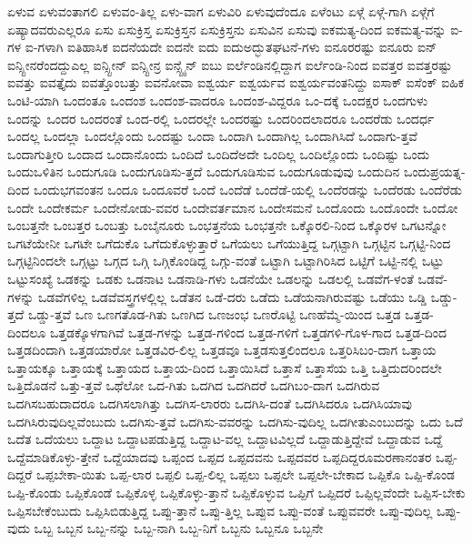 {ಏಳುವ
ಏಳುವಂತಾಗಲಿ
ಏಳುವಂ-ತಿಲ್ಲ
ಏಳು-ವಾಗ
ಏಳುವಿರಿ
ಏಳುವುದೆಂದೂ
ಏಳೆಂಟು
ಏಳ್ಗೆ
ಏಳ್ಗೆ-ಗಾಗಿ
ಏಳ್ಗೆಗೆ
ಏಷ್ಯಾದವರುಎಲ್ಲರೂ
ಏಸು
ಏಸುಕ್ರಿಸ್ತ
ಏಸುಕ್ರಿಸ್ತನ
ಏಸುಕ್ರಿಸ್ತನು
ಏಸುವಿನ
ಏಸುವು
ಐಕಮತ್ಯ-ದಿಂದ
ಐಕಮತ್ಯ-ವನ್ನು
ಐ-ಗಳ
ಐ-ಗಳಾಗಿ
ಐತಿಹಾಸಿಕ
ಐದನೆಯದೇ
ಐದನೇ
ಐದು
ಐದುಅದ್ಭುತಘಟನೆ-ಗಳು
ಐನೂರರಷ್ಟು
ಐನೂರು
ಐನ್
ಐನ್ಸ್ಟೀನರೆಂದದ್ದುಎಲ್ಲ
ಐನ್ಸ್ಟೀನ್
ಐನ್ಸ್ಟೀನ್ರ
ಐನ್ಸ್ಟೈನ್
ಐಬು
ಐರ್ಲೆಂಡಿನಲ್ಲಿದ್ದಾಗ
ಐರ್ಲೆಂಡಿ-ನಿಂದ
ಐವತ್ತರ
ಐವತ್ತರಷ್ಟು
ಐವತ್ತು
ಐವತ್ತೈದು
ಐವತ್ತೊಂಬತ್ತು
ಐವನೋವಾ
ಐಶ್ವರ್ಯ
ಐಶ್ವರ್ಯವ
ಐಶ್ವರ್ಯವಂತನಿದ್ದು
ಐಸಾಕ್
ಐಸೆಂಕ್
ಐಹಿಕ
ಒಂಟಿ-ಯಾಗಿ
ಒಂದಂತೂ
ಒಂದಂಶ
ಒಂದಂಶ-ವಾದರೂ
ಒಂದಂಶ-ವಿದ್ದರೂ
ಒಂ-ದಕ್ಕೆ
ಒಂದಕ್ಷರ
ಒಂದಗುಳು
ಒಂದನ್ನು
ಒಂದರ
ಒಂದರಂತೆ
ಒಂದ-ರಲ್ಲಿ
ಒಂದರಲ್ಲೇ
ಒಂದರಷ್ಟು
ಒಂದರಿಂದಲಾದರೂ
ಒಂದರೆಡು
ಒಂದರ್ಧ
ಒಂದಲ್ಲ
ಒಂದಲ್ಲಾ
ಒಂದಲ್ಲೊಂದು
ಒಂದಷ್ಟು
ಒಂದಾ
ಒಂದಾಗಿ
ಒಂದಾಗಿಲ್ಲ
ಒಂದಾಗಿಸಿದೆ
ಒಂದಾಗು-ತ್ತವೆ
ಒಂದಾಗುತ್ತೀರಿ
ಒಂದಾದ
ಒಂದಾನೊಂದು
ಒಂದಿದೆ
ಒಂದಿದೆಅದೇ
ಒಂದಿಲ್ಲ
ಒಂದಿಲ್ಲೊಂದು
ಒಂದಿಷ್ಟು
ಒಂದು
ಒಂದುಒಳಿತಿನ
ಒಂದುಗೂಡಿ
ಒಂದುಗೂಡಿಸು-ತ್ತದೆ
ಒಂದುಗೂಡಿಸುವ
ಒಂದುಗೂಡುವುವು
ಒಂದುದಿನ
ಒಂದುಪ್ರಯತ್ನ-ದಿಂದ
ಒಂದುಭಗವಂತನ
ಒಂದೂ
ಒಂದೂವರೆ
ಒಂದೆ
ಒಂದೆಡೆ
ಒಂದೆಡೆ-ಯಲ್ಲಿ
ಒಂದೆರಡನ್ನು
ಒಂದೆರಡು
ಒಂದೆರೆಡು
ಒಂದೇ
ಒಂದೇಕರ್ಮ
ಒಂದೇನೋಡು-ವವರ
ಒಂದೇವರ್ತಮಾನ
ಒಂದೇಸಮನೆ
ಒಂದೊಂದು
ಒಂದೊಂದೇ
ಒಂದೋ
ಒಂಬತ್ತನೇ
ಒಂಬತ್ತರ
ಒಂಬತ್ತು
ಒಂಬೈನೂರು
ಒಂಭತ್ತನೆಯ
ಒಂಭತ್ತನೇ
ಒಕ್ಕೊರಲಿ-ನಿಂದ
ಒಕ್ಕೊರಳ
ಒಗಟನ್ನೋ
ಒಗಟೆಯೇನೀ
ಒಗಟೇ
ಒಗೆದುಕೊ
ಒಗೆದುಕೊಳ್ಳುತ್ತಾರೆ
ಒಗೆಯಲು
ಒಗೆಯುತ್ತಿದ್ದ
ಒಗ್ಗಟ್ಟಾಗಿ
ಒಗ್ಗಟ್ಟಿನ
ಒಗ್ಗಟ್ಟಿ-ನಿಂದ
ಒಗ್ಗಟ್ಟಿನಿಂದಲೇ
ಒಗ್ಗಟ್ಟು
ಒಗ್ಗದ
ಒಗ್ಗಿ
ಒಗ್ಗಿಕೊಂಡಿದ್ದ
ಒಗ್ಗು-ವಂತೆ
ಒಟ್ಟಾಗಿ
ಒಟ್ಟಾಗಿರಿಸಿದ
ಒಟ್ಟಿಗೆ
ಒಟ್ಟಿ-ನಲ್ಲಿ
ಒಟ್ಟು
ಒಟ್ಟುಸಂಖ್ಯೆ
ಒಡಕನ್ನು
ಒಡಕು
ಒಡನಾಟ
ಒಡನಾಡಿ-ಗಳು
ಒಡನೆಯೇ
ಒಡಲನ್ನು
ಒಡಲಲ್ಲಿ
ಒಡವೆಗ-ಳಂತೆ
ಒಡವೆ-ಗಳನ್ನು
ಒಡವೆಗಳಿಲ್ಲ
ಒಡವೆವಸ್ತ್ರಗಳಲ್ಲಿಲ್ಲ
ಒಡೆತನ
ಒಡೆ-ದರು
ಒಡೆದು
ಒಡೆಯನಾಗಿರುವಷ್ಟು
ಒಡೆಯು
ಒಡ್ಡಿ
ಒಡ್ಡು-ತ್ತದೆ
ಒಡ್ಡು-ತ್ತವೆ
ಒಣ
ಒಣಗತೊಡ-ಗಿತು
ಒಣಗಿದ
ಒಣಜಂಭ
ಒಣರೊಟ್ಟಿ
ಒಣಹೆಮ್ಮೆ-ಯಿಂದ
ಒತ್ತಡ
ಒತ್ತಡ-ದಿಂದಲೂ
ಒತ್ತಡಕ್ಕೊಳಗಾಗಿವೆ
ಒತ್ತಡ-ಗಳನ್ನು
ಒತ್ತಡ-ಗಳಿಂದ
ಒತ್ತಡ-ಗಳಿಗೆ
ಒತ್ತಡಗಳಿ-ಗೊಳ-ಗಾದ
ಒತ್ತಡ-ದಿಂದ
ಒತ್ತಡದಿಂದಾಗಿ
ಒತ್ತಡಯಾರೋ
ಒತ್ತಡವಿರ-ಲಿಲ್ಲ
ಒತ್ತಡವೂ
ಒತ್ತಡಸುತ್ತಲಿಂದಲೂ
ಒತ್ತರಿಸಿಬಂ-ದಾಗ
ಒತ್ತಾಯ
ಒತ್ತಾಯಕ್ಕೂ
ಒತ್ತಾಯಕ್ಕೆ
ಒತ್ತಾಯದ
ಒತ್ತಾಯ-ದಿಂದ
ಒತ್ತಾಯಿಸಿದೆ
ಒತ್ತಾಸೆ
ಒತ್ತಾಸೆಯ
ಒತ್ತಿ
ಒತ್ತಿದುದರಿಂದಲೇ
ಒತ್ತಿದೊಡನೆ
ಒತ್ತು-ತ್ತವೆ
ಒಥೆಲೋ
ಒದ-ಗಿತು
ಒದಗಿದ
ಒದಗಿದರೆ
ಒದಗಿಬಂ-ದಾಗ
ಒದಗಿರುವ
ಒದಗಿಸಬಹುದಾದರೂ
ಒದಗಿಸಲಾಗಿತ್ತು
ಒದಗಿಸ-ಲಾರರು
ಒದಗಿಸಿ-ದಂತೆ
ಒದಗಿಸಿದರೂ
ಒದಗಿಸಿಯಾವು
ಒದಗಿಸಿರುವುದಿಲ್ಲವೆಂಬುದು
ಒದಗಿಸು-ತ್ತವೆ
ಒದಗಿಸು-ವವರನ್ನು
ಒದಗಿಸು-ವುದಿಲ್ಲ
ಒದಗೀತುಎಂಬುದನ್ನು
ಒದು
ಒದೆ
ಒದೆತ
ಒದೆಯಲು
ಒದ್ದಾಟ
ಒದ್ದಾಟಪಡುತ್ತಿದ್ದ
ಒದ್ದಾಟ-ವಲ್ಲ
ಒದ್ದಾಟವಿಲ್ಲದೆ
ಒದ್ದಾಡುತ್ತಿದ್ದೇವೆ
ಒದ್ದಾಡುವ
ಒದ್ದೆ
ಒದ್ದೆಮಾಡಿಕೊಳ್ಳು-ತ್ತೇನೆ
ಒದ್ದೆಯಾದವು
ಒಪ್ಪಂದ
ಒಪ್ಪದ
ಒಪ್ಪದವನು
ಒಪ್ಪದವರ
ಒಪ್ಪದಿದ್ದರೂಮರಣಾನಂತರ
ಒಪ್ಪ-ದಿದ್ದರೆ
ಒಪ್ಪಬೇಕಾ-ಯಿತು
ಒಪ್ಪ-ಲಾರ
ಒಪ್ಪಲಿ
ಒಪ್ಪ-ಲಿಲ್ಲ
ಒಪ್ಪಲು
ಒಪ್ಪಲೇ
ಒಪ್ಪಲೇ-ಬೇಕಾದ
ಒಪ್ಪಿಕೊ
ಒಪ್ಪಿ-ಕೊಂಡ
ಒಪ್ಪಿ-ಕೊಂಡು
ಒಪ್ಪಿಕೊಂಡೆ
ಒಪ್ಪಿಕೊಳ್ಳ
ಒಪ್ಪಿಕೊಳ್ಳು-ತ್ತಾನೆ
ಒಪ್ಪಿಕೊಳ್ಳುವ
ಒಪ್ಪಿಗೆ
ಒಪ್ಪಿದರೆ
ಒಪ್ಪಿಲ್ಲವೆಂದೇ
ಒಪ್ಪಿಸ-ಬೇಕು
ಒಪ್ಪಿಸಬೇಕೆಂಬುದು
ಒಪ್ಪಿಸಿಬಿಡುತ್ತಿದ್ದ
ಒಪ್ಪು-ತ್ತಾನೆ
ಒಪ್ಪು-ತ್ತಿಲ್ಲ
ಒಪ್ಪುವ
ಒಪ್ಪು-ವಂತೆ
ಒಪ್ಪುವವರೇ
ಒಪ್ಪು-ವುದಿಲ್ಲ
ಒಪ್ಪು-ವುದು
ಒಬ್ಬ
ಒಬ್ಬನ
ಒಬ್ಬ-ನನ್ನು
ಒಬ್ಬ-ನಾಗಿ
ಒಬ್ಬ-ನಿಗೆ
ಒಬ್ಬನು
ಒಬ್ಬನೂ
ಒಬ್ಬನೇ
}
